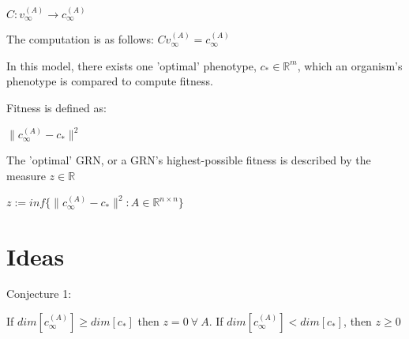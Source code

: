 \documentclass[a4paper,12pt]{article}
\begin{document}
$C: v_{\infty}^{(A)} \rightarrow c^{(A)}_{\infty}$

The computation is as follows: $Cv_{\infty}^{(A)} = c_{\infty}^{(A)}$

In this model, there exists one 'optimal' phenotype, $c_{*} \in \mathbb{R}^{m}$, which an organism's phenotype is compared to compute fitness. 

Fitness is defined as: 

$\lVert c_{\infty}^{(A)} - c_{*} \rVert^{2}$

The 'optimal' GRN, or a GRN's highest-possible fitness is described by the measure $z \in \mathbb{R}$

$ z := inf\{\lVert c_{\infty}^{(A)} - c_{*} \rVert^{2}: A \in \mathbb{R}^{n \times n}\}$

\section{Ideas}

Conjecture 1:

 If $dim{[c_{\infty}^{(A)}]} \geq dim{[c_{*}]}$ then $z = 0\ \forall \ A$. If $dim{[c_{\infty}^{(A)}]} <  dim{[c_{*}]}$, then $z \geq 0$
\end{document}
